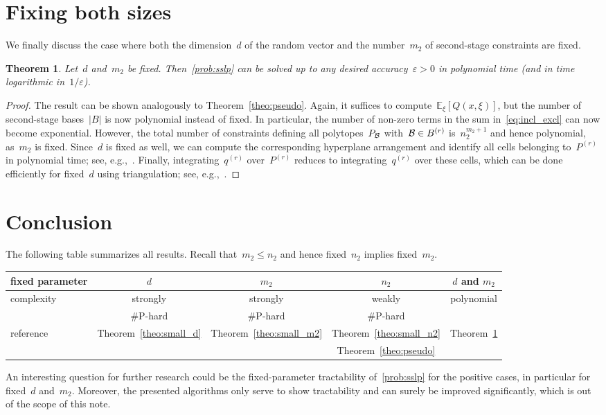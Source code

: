 \documentclass{article}
\newtheorem{theorem}{Theorem}
\newcommand{\card}{\#}
\newcommand{\E}{\mathbb{E}}
\begin{document}
\section{Fixing both sizes}\label{sec:fixed_both}

We finally discuss the case where both the dimension~$d$ of the random
vector and the number~$m_2$ of second-stage constraints are fixed.
\begin{theorem}\label{theo:both}
  Let~$d$ and~$m_2$ be fixed. Then~\eqref{prob:sslp} can be solved up
  to any desired accuracy~$\varepsilon>0$ in polynomial time (and in
  time logarithmic in~$1/\varepsilon$).
\end{theorem}
\begin{proof}
  The result can be shown analogously to
  Theorem~\ref{theo:pseudo}. Again, it suffices to
  compute~$\E_\xi[Q(x,\xi)]$, but the number of second-stage
  bases~$|B|$ is now polynomial instead of fixed. In particular, the
  number of non-zero terms in the sum in~\eqref{eq:incl_excl} can now
  become exponential. However, the total number of constraints
  defining all polytopes~$P_{\cal B}$ with~${\cal B}\in B^{(r)}$
  is~$n_2^{m_2+1}$ and hence polynomial, as~$m_2$ is fixed. Since~$d$
  is fixed as well, we can compute the corresponding hyperplane
  arrangement and identify all cells belonging to~$P^{(r)}$ in
  polynomial time; see, e.g.,~\cite{Edelsbrunner86}. Finally,
  integrating~$q^{(r)}$ over~$P^{(r)}$ reduces to
  integrating~$q^{(r)}$ over these cells, which can be done
  efficiently for fixed~$d$ using triangulation; see,
  e.g.,~\cite{Lawrence91}.
\end{proof}

\section{Conclusion}

The following table summarizes all results. Recall that~$m_2\le n_2$
and hence fixed~$n_2$ implies fixed~$m_2$.
\bigskip
\begin{center}
\begin{tabular}{l|c|c|c|c}
  fixed parameter & $d$ & $m_2$ & $n_2$ & $d$ and $m_2$ \\
  \hline
  complexity & strongly & strongly & weakly & polynomial\\
  & \card P-hard & \card P-hard & \card P-hard\\
  \hline
  reference & Theorem~\ref{theo:small_d} & Theorem~\ref{theo:small_m2} & Theorem~\ref{theo:small_n2} & Theorem~\ref{theo:both}\\
  &&& Theorem~\ref{theo:pseudo}
\end{tabular}
\end{center}
\bigskip
\noindent An interesting question for further research could be the
fixed-parameter tractability of~\eqref{prob:sslp} for the positive
cases, in particular for fixed~$d$ and~$m_2$. Moreover, the presented
algorithms only serve to show tractability and can surely be improved
significantly, which is out of the scope of this note.
\end{document}
